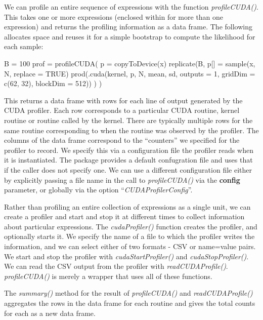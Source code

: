 \documentclass[article]{jss}
\def\R{\proglang{R}}
\def\Rpkg#1{\pkg{#1}}
\def\Rfunc#1{\textsl{#1()}}
\def\Rarg#1{\textbf{#1}}
\def\Roption#1{\dquote{\textsl{#1}}}
\def\dquote#1{``#1''}
\begin{document}
We can profile an entire sequence of \R{} expressions with the \R{}
function \Rfunc{profileCUDA}.  This takes one or more \R{} expressions
(enclosed within {} for more than one expression) and returns the
profiling information as a data frame.
The following allocates space and reuses it for a simple bootstrap
to compute the likelihood for each sample:  
\begin{RCode}
B = 100
prof = profileCUDA( {
  p = copyToDevice(x)
  replicate(B, {
      p[] = sample(x, N, replace = TRUE)
      prod(.cuda(kernel, p, N, mean, sd, outputs = 1,  
                   gridDim = c(62, 32), blockDim = 512))
  })
})
\end{RCode}
This returns a data frame with rows for each line of output generated
by the CUDA profiler.  Each row corresponds to a particular CUDA
routine, kernel routine or routine called by the kernel.  There are
typically multiple rows for the same routine corresponding to when the
routine was observed by the profiler.  The columns of the data frame
correspond to the \dquote{counters} we specified for the profiler to
record.  We specify this via a configuration file the profiler reads
when it is instantiated. The \Rpkg{RCUDA} package provides a default
confugration file and uses that if the caller does not specify one.
We can use a different configuration file either by explicitly passing
a file name in the call to \Rfunc{profileCUDA} via the \Rarg{config}
parameter, or globally via the \R{} option
\Roption{CUDAProfilerConfig}.


Rather than profiling an entire collection of \R{} expressions as a
single unit, we can create a profiler and start and stop it at
different times to collect information about particular \R{}
expressions.  The \Rfunc{cudaProfiler} function creates the profiler,
and optionally starts it.  We specify the name of a file to which the
profiler writes the information, and we can select either of two
formats - CSV or name=value pairs.  We start and stop the profiler
with \Rfunc{cudaStartProfiler} and \Rfunc{cudaStopProfiler}.  We can
read the CSV output from the profiler with \Rfunc{readCUDAProfile}.
\Rfunc{profileCUDA} is merely a wrapper that uses all of these
functions.

The \Rfunc{summary} method for the result of \Rfunc{profileCUDA} and
\Rfunc{readCUDAProfile} aggregates the rows in the data frame for each
routine and gives the total counts for each as a new data frame.
\end{document}
